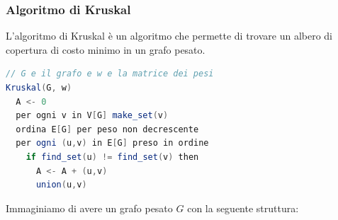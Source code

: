 \documentclass[a4paper]{article}
\begin{document}
\subsubsection{Algoritmo di Kruskal}

L'algoritmo di Kruskal è un algoritmo che permette di trovare un albero di copertura di costo minimo in un grafo pesato.

\begin{lstlisting}[language=Scala]
// G e il grafo e w e la matrice dei pesi 
Kruskal(G, w)
  A <- 0
  per ogni v in V[G] make_set(v)
  ordina E[G] per peso non decrescente
  per ogni (u,v) in E[G] preso in ordine
    if find_set(u) != find_set(v) then
      A <- A + (u,v)
      union(u,v)
\end{lstlisting}
\ex{}
{
  Immaginiamo di avere un grafo pesato $G$ con la seguente struttura:
  \begin{figure}[H]
    \centering
\end{figure}}
\end{document}
